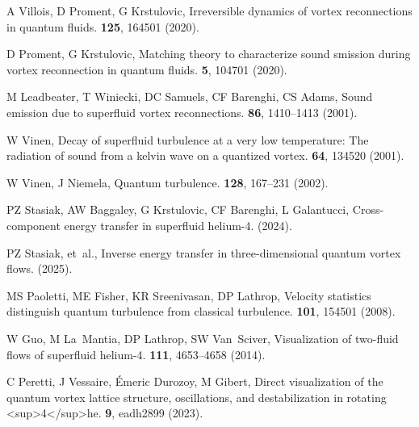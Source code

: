 \documentclass[9pt,twocolumn,twoside]{pnas-new}
\begin{document}
\begin{thebibliography}{10}
	A Villois, D Proment, G Krstulovic, Irreversible dynamics of vortex reconnections in quantum fluids.
	 \textbf{125}, 164501 (2020).
	
	D Proment, G Krstulovic, Matching theory to characterize sound smission during vortex reconnection in quantum fluids.
	 \textbf{5}, 104701 (2020).
	
	M Leadbeater, T Winiecki, DC Samuels, CF Barenghi, CS Adams, Sound emission due to superfluid vortex reconnections.
	 \textbf{86}, 1410--1413 (2001).
	
	W Vinen, Decay of superfluid turbulence at a very low temperature: The radiation of sound from a kelvin wave on a quantized vortex.
	 \textbf{64}, 134520 (2001).
	
	W Vinen, J Niemela, Quantum turbulence.
	 \textbf{128}, 167--231 (2002).
	
	PZ Stasiak, AW Baggaley, G Krstulovic, CF Barenghi, L Galantucci, Cross-component energy transfer in superfluid helium-4.
	 (2024).
	
	PZ Stasiak, et~al., Inverse energy transfer in three-dimensional quantum vortex flows.
	 (2025).
	
	MS Paoletti, ME Fisher, KR Sreenivasan, DP Lathrop, Velocity statistics distinguish quantum turbulence from classical turbulence.
	 \textbf{101}, 154501 (2008).
	
	W Guo, M La~Mantia, DP Lathrop, SW Van~Sciver, Visualization of two-fluid flows of superfluid helium-4.
	 \textbf{111}, 4653--4658 (2014).
	
	C Peretti, J Vessaire, Émeric Durozoy, M Gibert, Direct visualization of the quantum vortex lattice structure, oscillations, and destabilization in rotating <sup>4</sup>he.
	 \textbf{9}, eadh2899 (2023).
	

\end{thebibliography}
\end{document}
